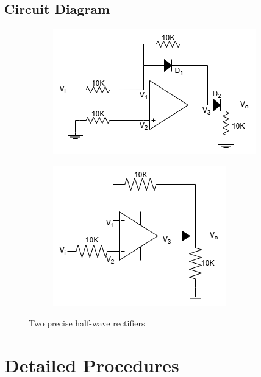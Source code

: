     \subsection{Circuit Diagram}
    \begin{figure}[h]
    \centering
    \begin{subfigure}[h]{0.45\textwidth}
        \centering
        \includegraphics[width=0.7\linewidth]{Lab12/Lab12a.drawio.png}
        \caption{}
        \label{lab12a}
        \end{subfigure}
    \hfill
        \begin{subfigure}[h]{0.45\textwidth}
        \centering
        \includegraphics[width=0.7\linewidth]{Lab12/Lab12b.drawio.png}
        \caption{}
        \label{lab12b}
        \end{subfigure}
    \caption{Two precise half-wave rectifiers}
    \label{lab12f}
    \end{figure}
    \FloatBarrier

\section{Detailed Procedures}
